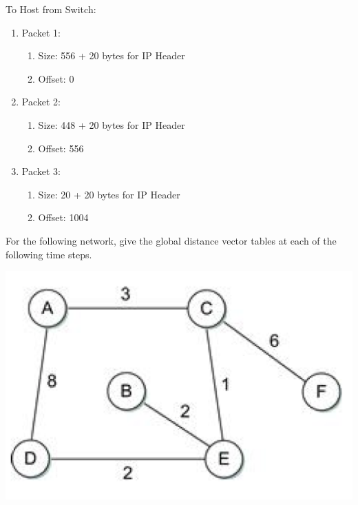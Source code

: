 \documentclass[12pt,addpoints,answers]{exam}
\begin{document}
\begin{questions}
\begin{solution}
	To Host from Switch:
	\begin{enumerate}	
	\item Packet 1: 
	\begin{enumerate}
		\item Size: 556 + 20 bytes for IP Header
		\item Offset: 0
	\end{enumerate}
	\item Packet 2: 
	\begin{enumerate}
		\item Size: 448 + 20 bytes for IP Header
		\item Offset: 556
	\end{enumerate}
	\item Packet 3:
	\begin{enumerate}
		\item Size: 20 + 20 bytes for IP Header
		\item Offset: 1004
	\end{enumerate}
\end{enumerate}
\end{solution}

\question For the following network, give the global distance vector tables at each of the following time steps.
\begin{center}
\includegraphics[width=0.4\linewidth]{fig/vector.png}
\end{center}
\end{questions}
\end{document}
